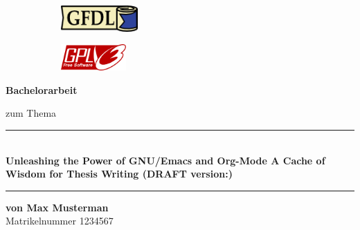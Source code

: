 
\begin{titlepage}

	\begin{figure}[!h]
		\begin{subfigure}[b]{0.5\linewidth}
			\includegraphics[height=1cm]{./images/gfdl}
		\end{subfigure}
		\hfill
		\begin{subfigure}[b]{0.15\linewidth}  %
			\includegraphics[height=1cm]{./images/gplv3}
		\end{subfigure}
	\end{figure}

        \vspace{1cm}

	\begin{center}
		\textbf{\LARGE{Bachelorarbeit}}

		\vspace{.5cm}


		\vspace{.5cm}

		zum Thema

		\vspace{1cm}
		\rule{\textwidth}{2pt}
		$~~$\\

		\textbf{
			\LARGE{Unleashing the Power of GNU/Emacs and Org-Mode} \break
			\Large{A Cache of Wisdom for Thesis Writing} \break
			(DRAFT version:\gitVersion)
		}

		\rule{\textwidth}{2pt}
		\vspace{2cm}

		\textbf{von \Large{Max Musterman}}\\
		\Large{Matrikelnummer  1234567}\\
	\end{center}

	\vfill



\end{titlepage}
